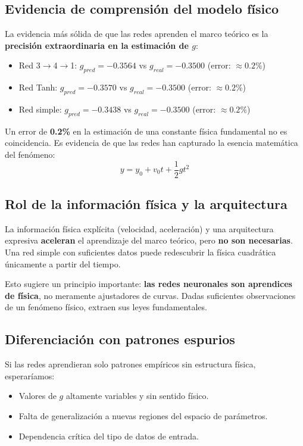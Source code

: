 \documentclass[11pt]{article}
\begin{document}
	\subsection{Evidencia de comprensión del modelo físico}
	La evidencia más sólida de que las redes aprenden el marco teórico es la \textbf{precisión extraordinaria en la estimación de $g$}:
	\begin{itemize}
		\item Red 3$\rightarrow$4$\rightarrow$1: $g_{pred} = -0.3564$ vs $g_{real} = -0.3500$ (error: $\approx 0.2\%$)
		\item Red Tanh: $g_{pred} = -0.3570$ vs $g_{real} = -0.3500$ (error: $\approx 0.2\%$)
		\item Red simple: $g_{pred} = -0.3438$ vs $g_{real} = -0.3500$ (error: $\approx 0.2\%$)
	\end{itemize}
	
	Un error de \textbf{0.2\%} en la estimación de una constante física fundamental no es coincidencia. Es evidencia de que las redes han capturado la esencia matemática del fenómeno: 
	$$y = y_0 + v_0 t + \frac{1}{2} g t^2$$
	
	\subsection{Rol de la información física y la arquitectura}
	La información física explícita (velocidad, aceleración) y una arquitectura expresiva \textbf{aceleran} el aprendizaje del marco teórico, pero \textbf{no son necesarias}. Una red simple con suficientes datos puede redescubrir la física cuadrática únicamente a partir del tiempo.
	
	Esto sugiere un principio importante: \textbf{las redes neuronales son aprendices de física}, no meramente ajustadores de curvas. Dadas suficientes observaciones de un fenómeno físico, extraen sus leyes fundamentales.
	
	\subsection{Diferenciación con patrones espurios}
	Si las redes aprendieran solo patrones empíricos sin estructura física, esperaríamos:
	\begin{itemize}
		\item Valores de $g$ altamente variables y sin sentido físico.
		\item Falta de generalización a nuevas regiones del espacio de parámetros.
		\item Dependencia crítica del tipo de datos de entrada.
	\end{itemize}
	
\end{document}

